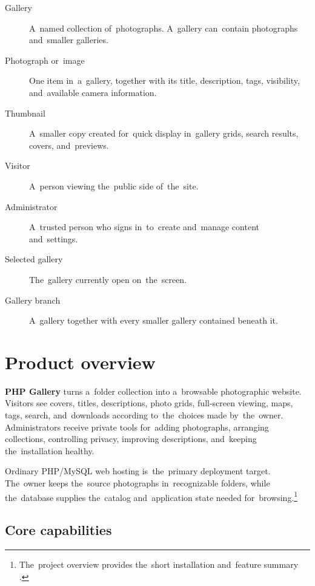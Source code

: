 \documentclass[11pt,a4paper]{article}
\newcommand{\product}{\textbf{PHP Gallery}}
\begin{document}
\begin{description}
  \item[Gallery] A~named collection of~photographs. A~gallery can~contain
  photographs and~smaller galleries.
  \item[Photograph or~image] One item in~a~gallery, together with its title,
  description, tags, visibility, and~available camera information.
  \item[Thumbnail] A~smaller copy created for~quick display in~gallery grids,
  search results, covers, and~previews.
  \item[Visitor] A~person viewing the~public side of~the~site.
  \item[Administrator] A~trusted person who signs in~to~create and~manage
  content and~settings.
  \item[Selected gallery] The~gallery currently open on~the~screen.
  \item[Gallery branch] A~gallery together with every smaller gallery contained
  beneath it.
\end{description}

\section{Product overview}
\label{sec:overview}

\product{} turns a~folder collection into a~browsable photographic website.
Visitors see covers, titles, descriptions, photo grids, full-screen viewing,
maps, tags, search, and~downloads according to~the~choices made by~the~owner.
Administrators receive private tools for~adding photographs, arranging
collections, controlling privacy, improving descriptions, and~keeping
the~installation healthy.

Ordinary PHP/MySQL web hosting is~the~primary deployment target. The~owner keeps
the~source photographs in~recognizable folders, while the~database supplies
the~catalog and~application state needed for~browsing.\footnote{The~project
overview provides the~short installation and~feature summary \cite{readme}.}

\subsection{Core capabilities}
\end{document}
